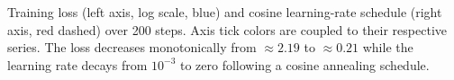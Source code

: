 \caption{Training loss (left axis, log scale, blue) and cosine learning-rate schedule (right axis, red dashed) over 200 steps. Axis tick colors are coupled to their respective series. The loss decreases monotonically from $\approx\!2.19$ to $\approx\!0.21$ while the learning rate decays from $10^{-3}$ to zero following a cosine annealing schedule.}
